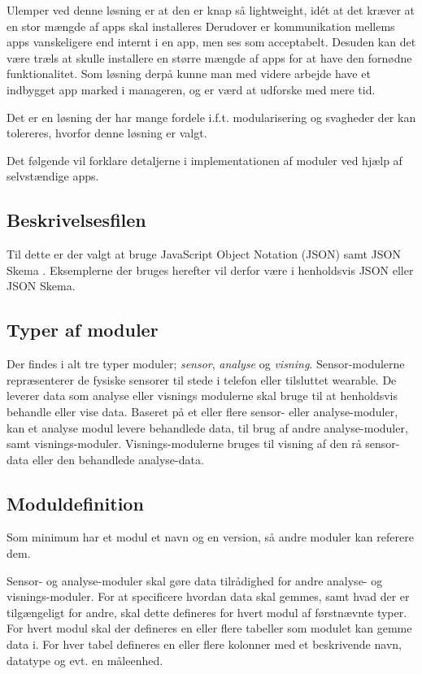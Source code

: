 Ulemper ved denne løsning er at den er knap så lightweight, idét at det kræver at en stor mængde af apps skal installeres
Derudover er kommunikation mellems apps vanskeligere end internt i en app, men ses som acceptabelt.
Desuden kan det være træls at skulle installere en større mængde af apps for at have den fornødne funktionalitet.
Som løsning derpå kunne man med videre arbejde have et indbygget app marked i manageren, og er værd at udforske med mere tid.

Det er en løsning der har mange fordele i.f.t. modularisering og svagheder der kan tolereres, hvorfor denne løsning er valgt. 

Det følgende vil forklare detaljerne i implementationen af moduler ved hjælp af selvstændige apps.

\subsection{Beskrivelsesfilen}

Til dette er der valgt at bruge JavaScript Object Notation (JSON) samt JSON Skema \cite{json_schema}.
Eksemplerne der bruges herefter vil derfor være i henholdsvis JSON eller JSON Skema.

\subsection{Typer af moduler}
Der findes i alt tre typer moduler; \textit{sensor}, \textit{analyse} og \textit{visning}.
Sensor-modulerne repræsenterer de fysiske sensorer til stede i telefon eller tilsluttet wearable.
De leverer data som analyse eller visnings modulerne skal bruge til at henholdsvis behandle eller vise data.
Baseret på et eller flere sensor- eller analyse-moduler, kan et analyse modul levere behandlede data, til brug af andre analyse-moduler, samt visnings-moduler.
Visnings-modulerne bruges til visning af den rå sensor-data eller den behandlede analyse-data.

\subsection{Moduldefinition}
Som minimum har et modul et navn og en version, så andre moduler kan referere dem.

Sensor- og analyse-moduler skal gøre data tilrådighed for andre analyse- og visnings-moduler.
For at specificere hvordan data skal gemmes, samt hvad der er tilgængeligt for andre, skal dette defineres for hvert modul af førstnævnte typer.
For hvert modul skal der defineres en eller flere tabeller som modulet kan gemme data i.
For hver tabel defineres en eller flere kolonner med et beskrivende navn, datatype og evt. en måleenhed.

